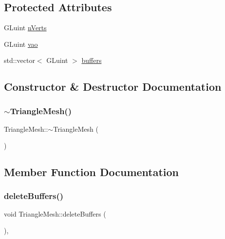 \subsection*{Protected Attributes}
\begin{DoxyCompactItemize}
\item 
G\+Luint \mbox{\hyperlink{class_triangle_mesh_a5775b5f33a2dc1b758b7e5c9be50a2ab}{n\+Verts}}
\item 
G\+Luint \mbox{\hyperlink{class_triangle_mesh_a51f91c0f3126061cd7f1fa71a1cc09b1}{vao}}
\item 
std\+::vector$<$ G\+Luint $>$ \mbox{\hyperlink{class_triangle_mesh_a6b4667d53b613e80bd39bb007c5988b6}{buffers}}
\end{DoxyCompactItemize}


\subsection{Constructor \& Destructor Documentation}
\mbox{\label{class_triangle_mesh_ad2e6daebfd73b0f3cf832b13a2bf300d}} 
\subsubsection{\texorpdfstring{$\sim$TriangleMesh()}{~TriangleMesh()}}
{\footnotesize\ttfamily Triangle\+Mesh\+::$\sim$\+Triangle\+Mesh (\begin{DoxyParamCaption}{ }\end{DoxyParamCaption})\hspace{0.3cm}{\ttfamily [virtual]}}



\subsection{Member Function Documentation}
\mbox{\label{class_triangle_mesh_ac92596aaae30b94eb274fd3e267c7387}} 
\subsubsection{\texorpdfstring{deleteBuffers()}{deleteBuffers()}}
{\footnotesize\ttfamily void Triangle\+Mesh\+::delete\+Buffers (\begin{DoxyParamCaption}{ }\end{DoxyParamCaption})\hspace{0.3cm}{\ttfamily [protected]}, {\ttfamily [virtual]}}

